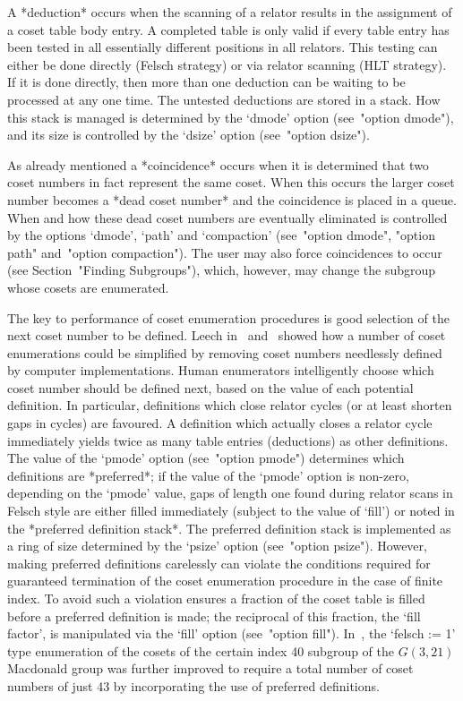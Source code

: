 A *deduction* occurs when the scanning of  a  relator
results in the assignment of a coset table  body  entry.  A  completed
table is only valid if every  table  entry  has  been  tested  in  all
essentially different positions in  all  relators.  This  testing  can
either be done directly (Felsch strategy) or via relator scanning (HLT
strategy). If it is done directly, then more than one deduction can be
waiting to be processed at any one time. The untested  deductions  are
stored in a stack. How this stack is  managed  is  determined  by  the
`dmode' option (see~"option dmode"), and its size is controlled by the
`dsize' option (see~"option dsize").

As already mentioned a *coincidence* occurs when it
is determined that two coset numbers in fact represent the same coset.
When this occurs  the  larger  coset  number  becomes  a  *dead  coset
number* and the coincidence is placed in  a
queue. When and how these dead coset numbers are eventually eliminated
is  controlled  by  the  options  `dmode',  `path'  and   `compaction'
(see~"option dmode", "option path" and~"option compaction"). The  user
may  also  force   coincidences   to   occur   (see   Section~"Finding
Subgroups"), which, however, may change the subgroup whose cosets  are
enumerated.

The key  to  performance  of  coset  enumeration  procedures  is  good
selection  of  the  next   coset   number   to   be   defined.   Leech
in~\cite{Lee77}  and~\cite{Lee84}  showed  how  a  number   of   coset
enumerations could be simplified by removing coset numbers  needlessly
defined by computer implementations. Human  enumerators  intelligently
choose which coset number should be defined next, based on  the  value
of each potential definition. In particular, definitions  which  close
relator cycles (or at least shorten gaps in cycles)  are  favoured.  A
definition which actually closes a relator  cycle  immediately  yields
twice as many table entries (deductions)  as  other  definitions.  The
value of the `pmode'  option  (see~"option  pmode")  determines  which
definitions are *preferred*; if the value of  the  `pmode'  option  is
non-zero, depending on the `pmode' value, gaps  of  length  one  found
during relator scans in Felsch style  are  either  filled  immediately
(subject to the value of `fill') or noted in the *preferred definition
stack*.  The  preferred  definition
stack is implemented as a ring  of  size  determined  by  the  `psize'
option (see~"option psize").  However,  making  preferred  definitions
carelessly  can  violate  the  conditions  required   for   guaranteed
termination of the coset enumeration procedure in the case  of  finite
index. To avoid such a violation {\ACE}  ensures  a  fraction  of  the
coset table is filled before  a  preferred  definition  is  made;  the
reciprocal of this fraction, the `fill factor', is manipulated via the
`fill' option (see~"option fill"). In~\cite{Hav91}, the `felsch :=  1'
type enumeration of the cosets of the certain index 40 subgroup of the
$G(3,21)$ Macdonald group was further  improved  to  require  a  total
number of coset numbers  of  just  43  by  incorporating  the  use  of
preferred definitions.

